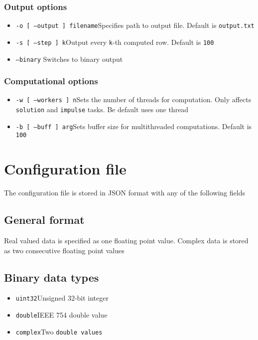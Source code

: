 \documentclass[12pt]{extarticle}
\newcommand{\code}[1]{\colorbox{gray!10}{\texttt{#1}}}
\begin{document}
            \subsubsection{Output options}
                \begin{itemize}
                    \item\code{-o [ --output ] filename}\qquad Specifies path to output file. Default is \code{output.txt}
                    \item\code{-s [ --step ] k}\qquad Output every \code{k}-th computed row. Default is \code{100}
                    \item\code{--binary} Switches to binary output
                \end{itemize}
            \subsubsection{Computational options}
                \begin{itemize}
                    \item\code{-w [ --workers ] n}\qquad Sets the number of threads for computation. Only affects \code{solution} and \code{impulse} tasks. Be default uses one thread
                    \item\code{-b [ --buff ] arg}\qquad Sets buffer size for multithreaded computations. Default is \code{100} 
                \end{itemize}
    \section{Configuration file}
        \par The configuration file is stored in JSON format with any of the following fields
        \subsection{General format}
            \par Real valued data is specified as one floating point value. Complex data is stored as two consecutive floating point values
        \subsection{Binary data types}
            \begin{itemize}
                \item\code{uint32}\qquad Unsigned 32-bit integer
                \item\code{double}\qquad IEEE 754 double value
                \item\code{complex}\qquad Two \code{double values}
            \end{itemize}
\end{document}
